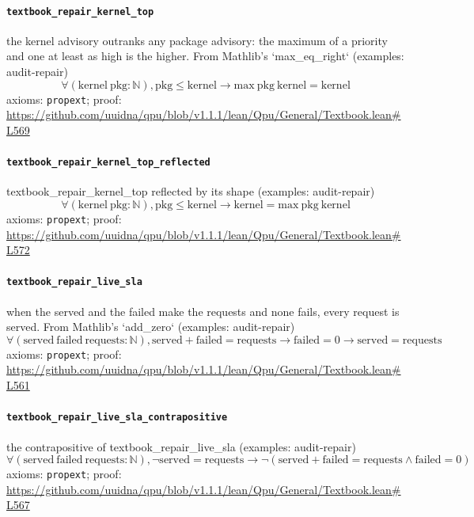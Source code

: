\documentclass[11pt]{article}
\begin{document}
\paragraph{\texttt{textbook\_repair\_kernel\_top}}
the kernel advisory outranks any package advisory: the maximum of a priority and one at least as high is the higher. From Mathlib's `max\_eq\_right` (examples: audit-repair)
\[ \forall (\mathrm{kernel}\ \mathrm{pkg} : \mathbb{N}), \mathrm{pkg} \le \mathrm{kernel} \to \mathrm{max}\ \mathrm{pkg}\ \mathrm{kernel} = \mathrm{kernel} \]
\noindent axioms: \texttt{propext}; proof: \url{https://github.com/uuidna/qpu/blob/v1.1.1/lean/Qpu/General/Textbook.lean\#L569}

\paragraph{\texttt{textbook\_repair\_kernel\_top\_reflected}}
textbook\_repair\_kernel\_top reflected by its shape (examples: audit-repair)
\[ \forall (\mathrm{kernel}\ \mathrm{pkg} : \mathbb{N}), \mathrm{pkg} \le \mathrm{kernel} \to \mathrm{kernel} = \mathrm{max}\ \mathrm{pkg}\ \mathrm{kernel} \]
\noindent axioms: \texttt{propext}; proof: \url{https://github.com/uuidna/qpu/blob/v1.1.1/lean/Qpu/General/Textbook.lean\#L572}

\paragraph{\texttt{textbook\_repair\_live\_sla}}
when the served and the failed make the requests and none fails, every request is served. From Mathlib's `add\_zero` (examples: audit-repair)
\[ \forall (\mathrm{served}\ \mathrm{failed}\ \mathrm{requests} : \mathbb{N}), \mathrm{served} + \mathrm{failed} = \mathrm{requests} \to \mathrm{failed} = 0 \to \mathrm{served} = \mathrm{requests} \]
\noindent axioms: \texttt{propext}; proof: \url{https://github.com/uuidna/qpu/blob/v1.1.1/lean/Qpu/General/Textbook.lean\#L561}

\paragraph{\texttt{textbook\_repair\_live\_sla\_contrapositive}}
the contrapositive of textbook\_repair\_live\_sla (examples: audit-repair)
\[ \forall (\mathrm{served}\ \mathrm{failed}\ \mathrm{requests} : \mathbb{N}), \neg \mathrm{served} = \mathrm{requests} \to \neg (\mathrm{served} + \mathrm{failed} = \mathrm{requests} \land \mathrm{failed} = 0) \]
\noindent axioms: \texttt{propext}; proof: \url{https://github.com/uuidna/qpu/blob/v1.1.1/lean/Qpu/General/Textbook.lean\#L567}
\end{document}
